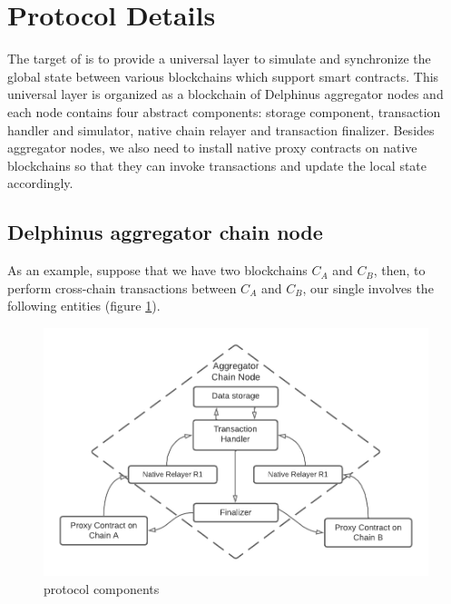 \documentclass[pageno]{jpaper}
\begin{document}
\section{Protocol Details}
The target of \dprotocol is to provide a universal layer to simulate and synchronize the global state between various blockchains which support smart contracts. This universal layer is organized as a blockchain of Delphinus aggregator nodes and each node contains four abstract components: storage component, transaction handler and simulator, native chain relayer and transaction finalizer.  Besides aggregator nodes, we also need to install native proxy contracts on native blockchains so that they can invoke transactions and update the local state accordingly.


\subsection{Delphinus aggregator chain node}
As an example, suppose that we have two blockchains $C_{A}$ and $C_{B}$, then, to perform cross-chain transactions between $C_A$  and $C_B$, our single \dprotocol involves the following entities (figure \ref{protocol-components}). 
\begin{figure}[ht]
\caption{protocol components}
\label{protocol-components}
\includegraphics[scale=0.5]{components}
\end{figure}
\end{document}
